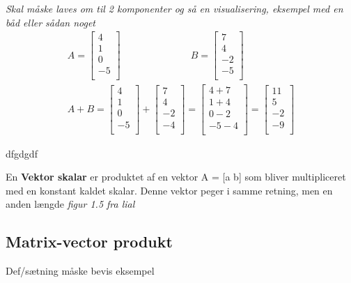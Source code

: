 \begin{eks}
\textit{Skal måske laves om til 2 komponenter og så en visualisering, eksempel med en båd eller sådan noget}
\begin{align*}
A=
\begin{bmatrix}
4\\
1\\
0\\
-5\\
\end{bmatrix}
\hspace{3cm}
B=
\begin{bmatrix}
7\\
4\\
-2\\
-5\\
\end{bmatrix}\\
A+B=
\begin{bmatrix}
4\\
1\\
0\\
-5\\
\end{bmatrix}
+
\begin{bmatrix}
7\\
4\\
-2\\
-4\\
\end{bmatrix}
=
\begin{bmatrix}
4+7\\
1+4\\
0-2\\
-5-4\\
\end{bmatrix}
=
\begin{bmatrix}
11\\
5\\
-2\\
-9\\
\end{bmatrix}
\end{align*}
\end{eks}

\begin{defn}
dfgdgdf
\end{defn}

\begin{defn}
En \textbf{Vektor skalar} er produktet af en vektor A = [a b] som bliver multipliceret med en konstant kaldet skalar. Denne vektor peger i samme retning, men en anden længde
\textit{figur 1.5 fra lial}
\end{defn}

\subsection{Matrix-vector produkt}

Def/sætning
måske bevis
eksempel
